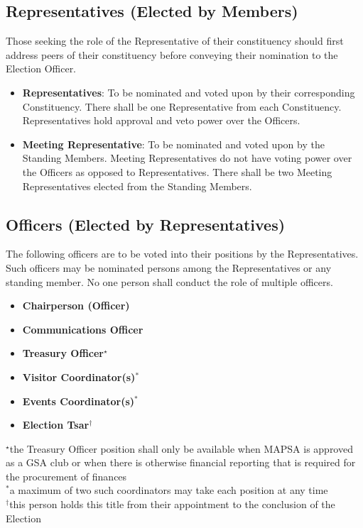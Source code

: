 \documentclass[8pt]{article}
\begin{document}
	\subsection{Representatives (Elected by Members)}
	Those seeking the role of the Representative of their constituency should first address peers of their constituency before conveying their nomination to the Election Officer. 
	\begin{itemize}
		\item \textbf{Representatives}: To be nominated and voted upon by their corresponding Constituency. There shall be one Representative from each Constituency. Representatives hold approval and veto power over the Officers.
		\item \textbf{Meeting Representative}: To be nominated and voted upon by the Standing Members. Meeting Representatives do not have voting power over the Officers as opposed to Representatives. There shall be two Meeting Representatives elected from the Standing Members.
	\end{itemize}
	\subsection{Officers (Elected by Representatives)}
	The following officers are to be voted into their positions by the Representatives. Such officers may be nominated persons among the Representatives or any standing member. No one person shall conduct the role of multiple officers.
	\begin{itemize}
		\item \textbf{Chairperson (Officer)}
		\item \textbf{Communications Officer}
		\item \textbf{Treasury Officer$^\star$}
		\item \textbf{Visitor Coordinator(s)$^*$}
		\item \textbf{Events Coordinator(s)$^*$}
		\item \textbf{Election Tsar$^\dagger$}
	\end{itemize}
	$^\star$the Treasury Officer position shall only be available when MAPSA is approved as a GSA club or when there is otherwise financial reporting that is required for the procurement of finances\\
	$^*$a maximum of two such coordinators may take each position at any time\\
	$^\dagger$this person holds this title from their appointment to the conclusion of the Election
\end{document}
